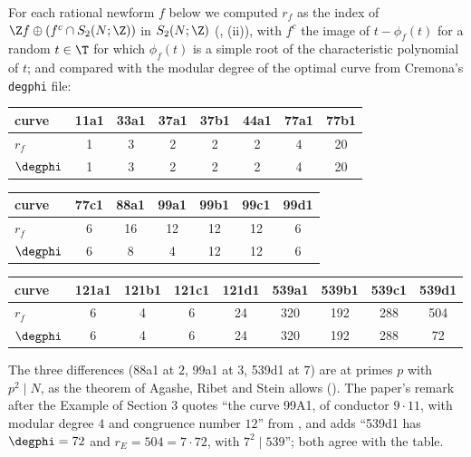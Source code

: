 \begin{example}\label{ex:hecke:congruence-numbers}
For each rational newform $f$ below we computed $r_f$ as the index of $\Z f\oplus(f^c\cap S_2(N;\Z))$ in $S_2(N;\Z)$ (, (ii)), with $f^c$ the image of
$t-\phi_f(t)$ for a random $t\in\T$ for which $\phi_f(t)$ is a simple root of the characteristic polynomial of $t$; and compared with the modular degree of the optimal curve from
Cremona's \texttt{degphi} file:
\begin{center}
\begin{tabular}{lccccccc}
\toprule
curve & 11a1 & 33a1 & 37a1 & 37b1 & 44a1 & 77a1 & 77b1\\
\midrule
$r_f$ & 1 & 3 & 2 & 2 & 2 & 4 & 20\\
$\degphi$ & 1 & 3 & 2 & 2 & 2 & 4 & 20\\
\bottomrule
\end{tabular}

\medskip
\begin{tabular}{lcccccc}
\toprule
curve & 77c1 & 88a1 & 99a1 & 99b1 & 99c1 & 99d1\\
\midrule
$r_f$ & 6 & 16 & 12 & 12 & 12 & 6\\
$\degphi$ & 6 & 8 & 4 & 12 & 12 & 6\\
\bottomrule
\end{tabular}

\medskip
\begin{tabular}{lcccccccc}
\toprule
curve & 121a1 & 121b1 & 121c1 & 121d1 & 539a1 & 539b1 & 539c1 & 539d1\\
\midrule
$r_f$ & 6 & 4 & 6 & 24 & 320 & 192 & 288 & 504\\
$\degphi$ & 6 & 4 & 6 & 24 & 320 & 192 & 288 & 72\\
\bottomrule
\end{tabular}
\end{center}
The three differences (88a1 at $2$, 99a1 at $3$, 539d1 at $7$) are at primes $p$ with $p^2\mid N$, as the theorem of Agashe, Ribet and Stein allows (). The paper's remark after
the Example of Section 3 quotes ``the curve 99A1, of conductor $9\cdot11$, with modular degree $4$ and congruence number $12$'' from \cite[Table 1]{ARS12}, and adds ``539d1 has $\degphi=72$ and
$r_E=504=7\cdot72$, with $7^2\mid539$''; both agree with the table.
\end{example}


